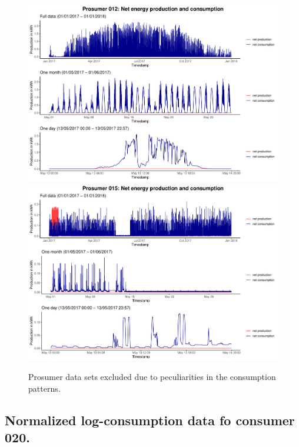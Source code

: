 \begin{centering}
\begin{figure}[!htbp]
        \includegraphics[width=\textwidth-0.85cm]{thesis/graphs/timeseries/p012_prod&cons.pdf}\vspace{0.3cm}
        \includegraphics[width=\textwidth-0.85cm]{thesis/graphs/timeseries/p015_prod&cons.pdf}
        \caption[Prosumer data sets excluded due to peculiarities in the consumption patterns]{Prosumer data sets excluded due to peculiarities in the consumption patterns. \quantnet}
        \label{App:Fig:excludedpros}
\end{figure}
\end{centering}


\subsection{Normalized log-consumption data fo consumer 020.} \label{App:Figures:transform}

